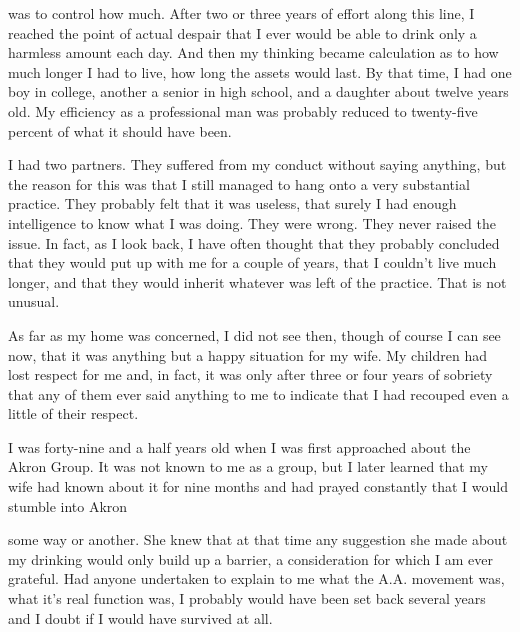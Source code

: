 \begin{biblechapter}
was to control how much. After two or three years of effort along this line, I reached the point of actual despair that I ever would be able to drink only a harmless amount each day. And then my thinking became calculation as to how much longer I had to live, how long the assets would last. By that time, I had one boy in college, another a senior in high school, and a daughter about twelve years old. My efficiency as a professional man was probably reduced to twenty-five percent of what it should have been.

I had two partners. They suffered from my conduct without saying anything, but the reason for this was that I still managed to hang onto a very substantial practice. They probably felt that it was useless, that surely I had enough intelligence to know what I was doing. They were wrong. They never raised the issue. In fact, as I look back, I have often thought that they probably concluded that they would put up with me for a couple of years, that I couldn’t live much longer, and that they would inherit whatever was left of the practice. That is not unusual.

As far as my home was concerned, I did not see then, though of course I can see now, that it was anything but a happy situation for my wife. My children had lost respect for me and, in fact, it was only after three or four years of sobriety that any of them ever said anything to me to indicate that I had recouped even a little of their respect.

I was forty-nine and a half years old when I was first approached about the Akron Group. It was not known to me as a group, but I later learned that my wife had known about it for nine months and had prayed constantly that I would stumble into Akron

some way or another. She knew that at that time any suggestion she made about my drinking would only build up a barrier, a consideration for which I am ever grateful. Had anyone undertaken to explain to me what the A.A. movement was, what it’s real function was, I probably would have been set back several years and I doubt if I would have survived at all.


\end{biblechapter}
